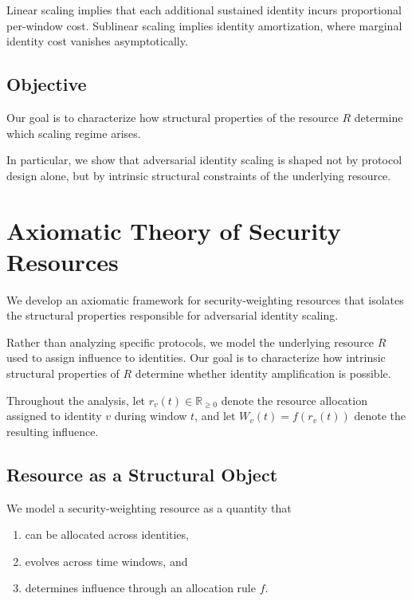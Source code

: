 \documentclass[journal]{IEEEtran}
\begin{document}
	Linear scaling implies that each additional sustained identity
	incurs proportional per-window cost.
	Sublinear scaling implies identity amortization,
	where marginal identity cost vanishes asymptotically.
	
	\subsection{Objective}
	
	Our goal is to characterize how structural properties
	of the resource $R$ determine which scaling regime arises.
	
	In particular, we show that adversarial identity scaling
	is shaped not by protocol design alone,
	but by intrinsic structural constraints of the underlying resource.
	
	
	\section{Axiomatic Theory of Security Resources}
	
	We develop an axiomatic framework for security-weighting
	resources that isolates the structural properties responsible
	for adversarial identity scaling.
	
	Rather than analyzing specific protocols, we model the
	underlying resource $R$ used to assign influence to identities.
	Our goal is to characterize how intrinsic structural
	properties of $R$ determine whether identity amplification
	is possible.
	
	Throughout the analysis,
	let $r_v(t) \in \mathbb{R}_{\ge 0}$ denote the
	resource allocation assigned to identity $v$
	during window $t$,
	and let $W_v(t) = f(r_v(t))$ denote the resulting influence.
	
	\subsection{Resource as a Structural Object}
	
	We model a security-weighting resource as a quantity that
	
	\begin{enumerate}
		\item can be allocated across identities,
		\item evolves across time windows, and
		\item determines influence through an allocation rule $f$.
	\end{enumerate}
	
\end{document}
